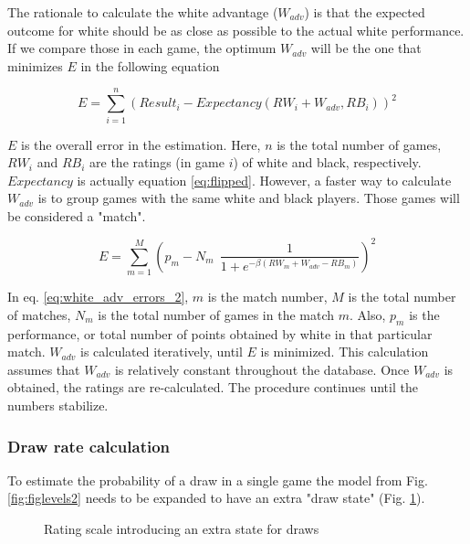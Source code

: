 \documentclass[12pt]{article}
\begin{document}
The rationale to calculate the white advantage ($W_{adv}$) is that the expected outcome for white should be as close as possible to the actual white performance.
If we compare those in each game, the optimum $W_{adv}$ will be the one that minimizes $E$ in the following equation

	\begin{equation} \label{eq:white_adv_errors_1}
	E = \sum\limits_{i=1}^n (Result_{i} - Expectancy(RW_{i} + W_{adv}, RB_{i}))^2
	\end{equation}

$E$ is the overall error in the estimation.
Here, $n$ is the total number of games, $RW_{i}$ and $RB_{i}$ are the ratings (in game $i$) of white and black, respectively.
$Expectancy$ is actually equation \ref{eq:flipped}.
However, a faster way to calculate $W_{adv}$ is to group games with the same white and black players. 
Those games will be considered a "match".

	\begin{equation} \label{eq:white_adv_errors_2}
	E = \sum\limits_{m=1}^M \left(p_{m} - N_{m}\:\: \frac{1}{1 + e^{-\beta(RW_{m} + W_{adv}-RB_{m})}}	\right)^2
	\end{equation}

In eq. \ref{eq:white_adv_errors_2}, $m$ is the match number, $M$ is the total number of matches, $N_{m}$ is the total number of games in the match $m$.
Also, $p_{m}$ is the performance, or total number of points obtained by white in that particular match.
$W_{adv}$ is calculated iteratively, until $E$ is minimized.
This calculation assumes that $W_{adv}$ is relatively constant throughout the database.
Once $W_{adv}$ is obtained, the ratings are re-calculated.
The procedure continues until the numbers stabilize.


\subsubsection*{Draw rate calculation}

To estimate the probability of a draw in a single game the model from Fig. \ref{fig:figlevels2} needs to be expanded to have an extra "draw state" (Fig. \ref{fig:threestates}).

	\begin{figure}[htb]
	\caption{\label{fig:threestates} Rating scale introducing an extra state for draws}
	\end{figure}
\end{document}
